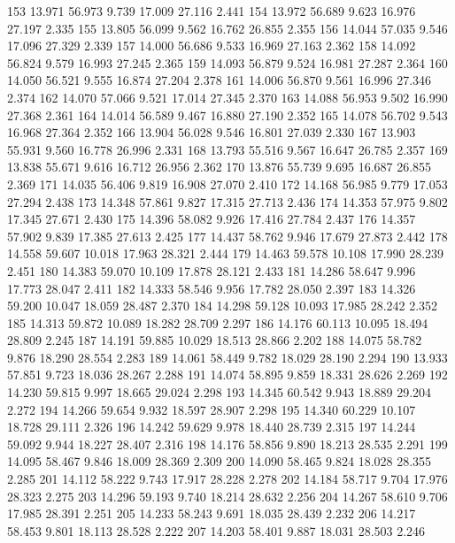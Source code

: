 \documentclass[a4paper,11pt]{scrartcl}
\begin{document}
\begin{Schunk}
\begin{Soutput}
153 13.971   56.973  9.739 17.009 27.116  2.441
154 13.972   56.689  9.623 16.976 27.197  2.335
155 13.805   56.099  9.562 16.762 26.855  2.355
156 14.044   57.035  9.546 17.096 27.329  2.339
157 14.000   56.686  9.533 16.969 27.163  2.362
158 14.092   56.824  9.579 16.993 27.245  2.365
159 14.093   56.879  9.524 16.981 27.287  2.364
160 14.050   56.521  9.555 16.874 27.204  2.378
161 14.006   56.870  9.561 16.996 27.346  2.374
162 14.070   57.066  9.521 17.014 27.345  2.370
163 14.088   56.953  9.502 16.990 27.368  2.361
164 14.014   56.589  9.467 16.880 27.190  2.352
165 14.078   56.702  9.543 16.968 27.364  2.352
166 13.904   56.028  9.546 16.801 27.039  2.330
167 13.903   55.931  9.560 16.778 26.996  2.331
168 13.793   55.516  9.567 16.647 26.785  2.357
169 13.838   55.671  9.616 16.712 26.956  2.362
170 13.876   55.739  9.695 16.687 26.855  2.369
171 14.035   56.406  9.819 16.908 27.070  2.410
172 14.168   56.985  9.779 17.053 27.294  2.438
173 14.348   57.861  9.827 17.315 27.713  2.436
174 14.353   57.975  9.802 17.345 27.671  2.430
175 14.396   58.082  9.926 17.416 27.784  2.437
176 14.357   57.902  9.839 17.385 27.613  2.425
177 14.437   58.762  9.946 17.679 27.873  2.442
178 14.558   59.607 10.018 17.963 28.321  2.444
179 14.463   59.578 10.108 17.990 28.239  2.451
180 14.383   59.070 10.109 17.878 28.121  2.433
181 14.286   58.647  9.996 17.773 28.047  2.411
182 14.333   58.546  9.956 17.782 28.050  2.397
183 14.326   59.200 10.047 18.059 28.487  2.370
184 14.298   59.128 10.093 17.985 28.242  2.352
185 14.313   59.872 10.089 18.282 28.709  2.297
186 14.176   60.113 10.095 18.494 28.809  2.245
187 14.191   59.885 10.029 18.513 28.866  2.202
188 14.075   58.782  9.876 18.290 28.554  2.283
189 14.061   58.449  9.782 18.029 28.190  2.294
190 13.933   57.851  9.723 18.036 28.267  2.288
191 14.074   58.895  9.859 18.331 28.626  2.269
192 14.230   59.815  9.997 18.665 29.024  2.298
193 14.345   60.542  9.943 18.889 29.204  2.272
194 14.266   59.654  9.932 18.597 28.907  2.298
195 14.340   60.229 10.107 18.728 29.111  2.326
196 14.242   59.629  9.978 18.440 28.739  2.315
197 14.244   59.092  9.944 18.227 28.407  2.316
198 14.176   58.856  9.890 18.213 28.535  2.291
199 14.095   58.467  9.846 18.009 28.369  2.309
200 14.090   58.465  9.824 18.028 28.355  2.285
201 14.112   58.222  9.743 17.917 28.228  2.278
202 14.184   58.717  9.704 17.976 28.323  2.275
203 14.296   59.193  9.740 18.214 28.632  2.256
204 14.267   58.610  9.706 17.985 28.391  2.251
205 14.233   58.243  9.691 18.035 28.439  2.232
206 14.217   58.453  9.801 18.113 28.528  2.222
207 14.203   58.401  9.887 18.031 28.503  2.246

\end{Soutput}
\end{Schunk}
\end{document}
